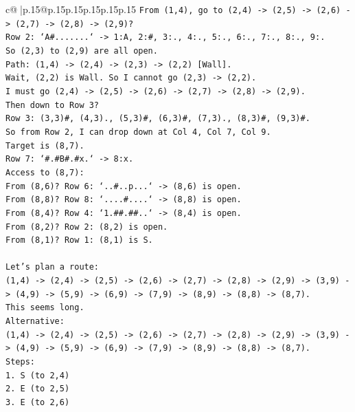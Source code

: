 \documentclass{article}
\begin{document}
{\begin{supertabular}{c@{$\;$}|p{.15\linewidth}@{}p{.15\linewidth}p{.15\linewidth}p{.15\linewidth}p{.15\linewidth}p{.15\linewidth}}
{{{\texttt{From (1,4), go to (2,4) {-}> (2,5) {-}> (2,6) {-}> (2,7) {-}> (2,8) {-}> (2,9)?} \\
\texttt{Row 2: `A\#.......` {-}> 1:A, 2:\#, 3:., 4:., 5:., 6:., 7:., 8:., 9:.} \\
\texttt{So (2,3) to (2,9) are all open.} \\
\texttt{Path: (1,4) {-}> (2,4) {-}> (2,3) {-}> (2,2) {[}Wall{]}.} \\
\texttt{Wait, (2,2) is Wall. So I cannot go (2,3) {-}> (2,2).} \\
\texttt{I must go (2,4) {-}> (2,5) {-}> (2,6) {-}> (2,7) {-}> (2,8) {-}> (2,9).} \\
\texttt{Then down to Row 3?} \\
\texttt{Row 3: (3,3)\#, (4,3)., (5,3)\#, (6,3)\#, (7,3)., (8,3)\#, (9,3)\#.} \\
\texttt{So from Row 2, I can drop down at Col 4, Col 7, Col 9.} \\
\texttt{Target is (8,7).} \\
\texttt{Row 7: `\#.\#B\#.\#x.` {-}> 8:x.} \\
\texttt{Access to (8,7):} \\
\texttt{From (8,6)? Row 6: `..\#..p...` {-}> (8,6) is open.} \\
\texttt{From (8,8)? Row 8: `....\#....` {-}> (8,8) is open.} \\
\texttt{From (8,4)? Row 4: `1.\#\#.\#\#..` {-}> (8,4) is open.} \\
\texttt{From (8,2)? Row 2: (8,2) is open.} \\
\texttt{From (8,1)? Row 1: (8,1) is S.} \\
\\ 
\texttt{Let's plan a route:} \\
\texttt{(1,4) {-}> (2,4) {-}> (2,5) {-}> (2,6) {-}> (2,7) {-}> (2,8) {-}> (2,9) {-}> (3,9) {-}> (4,9) {-}> (5,9) {-}> (6,9) {-}> (7,9) {-}> (8,9) {-}> (8,8) {-}> (8,7).} \\
\texttt{This seems long.} \\
\texttt{Alternative:} \\
\texttt{(1,4) {-}> (2,4) {-}> (2,5) {-}> (2,6) {-}> (2,7) {-}> (2,8) {-}> (2,9) {-}> (3,9) {-}> (4,9) {-}> (5,9) {-}> (6,9) {-}> (7,9) {-}> (8,9) {-}> (8,8) {-}> (8,7).} \\
\texttt{Steps:} \\
\texttt{1. S (to 2,4)} \\
\texttt{2. E (to 2,5)} \\
\texttt{3. E (to 2,6)} \\
}}}
\end{supertabular}}
\end{document}
